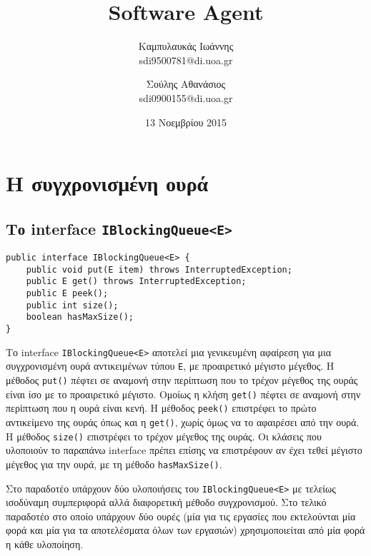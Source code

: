 \documentclass[a4paper,11pt]{article}
\begin{document}
\begin{sloppypar}

\title{Software Agent}
\author{Καμπυλαυκάς Ιωάννης \\ sdi9500781@di.uoa.gr \and Σούλης Αθανάσιος \\ sdi0900155@di.uoa.gr}
\date{13 Νοεμβρίου 2015}
\renewcommand{\contentsname}{Περιεχόμενα}


\maketitle

\section{Η συγχρονισμένη ουρά}

\subsection{Το interface \texttt{IBlockingQueue<E>}}

\begin{lstlisting}
public interface IBlockingQueue<E> {
    public void put(E item) throws InterruptedException;
    public E get() throws InterruptedException;
    public E peek();
    public int size();
    boolean hasMaxSize();
}

\end{lstlisting}

Το interface \texttt{IBlockingQueue<E>} αποτελεί μια γενικευμένη αφαίρεση για μια συγχρονισμένη ουρά αντικειμένων τύπου \texttt{E}, με προαιρετικό μέγιστο μέγεθος. Η μέθοδος \texttt{put()} πέφτει σε αναμονή στην περίπτωση που το τρέχον μέγεθος της ουράς είναι ίσο με το προαιρετικό μέγιστο. Ομοίως η κλήση \texttt{get()} πέφτει σε αναμονή στην περίπτωση που η ουρά είναι κενή. Η μέθοδος \texttt{peek()} επιστρέφει το πρώτο αντικείμενο της ουράς όπως και η \texttt{get()}, χωρίς όμως να το αφαιρέσει από την ουρά. Η μέθοδος \texttt{size()} επιστρέφει το τρέχον μέγεθος της ουράς. Οι κλάσεις που υλοποιούν το παραπάνω interface πρέπει επίσης να επιστρέφουν αν έχει τεθεί μέγιστο μέγεθος για την ουρά, με τη μέθοδο \texttt{hasMaxSize()}.

Στο παραδοτέο υπάρχουν δύο υλοποιήσεις του \texttt{IBlockingQueue<E>} με τελείως ισοδύναμη συμπεριφορά αλλά διαφορετική μέθοδο συγχρονισμού. Στο τελικό παραδοτέο στο οποίο υπάρχουν δύο ουρές (μία για τις εργασίες που εκτελούνται μία φορά και μία για τα αποτελέσματα όλων των εργασιών) χρησιμοποιείται από μία φορά η κάθε υλοποίηση.


\end{sloppypar}
\end{document}
